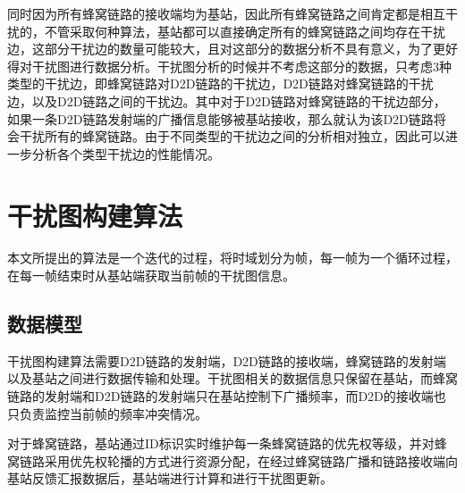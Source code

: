 \documentclass[figurelist,tablelist,algorithmlist,nomlist,masters]{seuthesix}
\begin{document}
	同时因为所有蜂窝链路的接收端均为基站，因此所有蜂窝链路之间肯定都是相互干扰的，不管采取何种算法，基站都可以直接确定所有的蜂窝链路之间均存在干扰边，这部分干扰边的数量可能较大，且对这部分的数据分析不具有意义，为了更好得对干扰图进行数据分析。干扰图分析的时候并不考虑这部分的数据，只考虑3种类型的干扰边，即蜂窝链路对D2D链路的干扰边，D2D链路对蜂窝链路的干扰边，以及D2D链路之间的干扰边。其中对于D2D链路对蜂窝链路的干扰边部分，如果一条D2D链路发射端的广播信息能够被基站接收，那么就认为该D2D链路将会干扰所有的蜂窝链路。由于不同类型的干扰边之间的分析相对独立，因此可以进一步分析各个类型干扰边的性能情况。
	
	\section{干扰图构建算法}
	本文所提出的算法是一个迭代的过程，将时域划分为帧，每一帧为一个循环过程，在每一帧结束时从基站端获取当前帧的干扰图信息。
	
	\subsection{数据模型}
	干扰图构建算法需要D2D链路的发射端，D2D链路的接收端，蜂窝链路的发射端以及基站之间进行数据传输和处理。干扰图相关的数据信息只保留在基站，而蜂窝链路的发射端和D2D链路的发射端只在基站控制下广播频率，而D2D的接收端也只负责监控当前帧的频率冲突情况。
	
	对于蜂窝链路，基站通过ID标识实时维护每一条蜂窝链路的优先权等级，并对蜂窝链路采用优先权轮播的方式进行资源分配，在经过蜂窝链路广播和链路接收端向基站反馈汇报数据后，基站端进行计算和进行干扰图更新。
	
\end{document}
